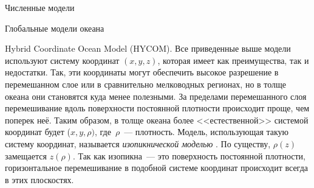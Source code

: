 \begin{chapter}{Численные модели}
\begin{section}{Глобальные модели океана}
\begin{paragraph}{Hybrid Coordinate Ocean Model (HYCOM).}
%
Все приведенные выше модели используют систему координат $(x, y, z)$, которая
имеет как преимущества, так и недостатки. Так, эти координаты могут 
обеспечить высокое разрешение в перемешанном слое или в сравнительно 
мелководных регионах, но в толще океана они становятся куда менее полезными.
За пределами перемешанного слоя перемешивание%
 вдоль поверхности
постоянной плотности происходит проще, чем поперек неё.
Таким образом, в толще океана более <<естественной>> системой координат 
будет ($x, y, \rho)$, где~$\rho$~--- плотность. Модель, использующая такую 
систему координат, называется \emph{изопикнической моделью}%
. 
По существу, $\rho(z)$ замещается $z(\rho)$. 
Так как изопикна~--- это поверхность постоянной плотности,
горизонтальное перемешивание в
подобной системе координат происходит всегда в этих плоскостях.
%


\end{paragraph}
\end{section}
\end{chapter}
